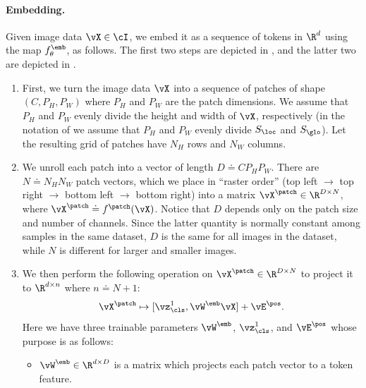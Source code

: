 \documentclass[../../book-main.tex]{subfiles}
\begin{document}
\paragraph{Embedding.} Given image data \(\vX \in \cI\), we embed it
as a sequence of tokens in \(\R^{d}\) using the map
\(f_{\theta}^{\emb}\), as follows. The first two steps are depicted
in , and the latter two are depicted in
.
\begin{enumerate}
    \item First, we turn the image data \(\vX\) into a sequence of
        patches of shape \((C, P_{H}, P_{W})\) where \(P_{H}\) and
        \(P_{W}\) are the patch dimensions. We assume that \(P_{H}\)
        and \(P_{W}\) evenly divide the height and width of \(\vX\),
        respectively (in the notation of
             we assume that
            \(P_{H}\) and \(P_{W}\) evenly divide \(S_{\loc}\) and
        \(S_{\glo}\)). Let the resulting grid of patches have
        \(N_{H}\) rows and \(N_{W}\) columns.
    \item We unroll each patch into a vector of length \(D \doteq
        CP_{H}P_{W}\). There are \(N \doteq N_{H}N_{W}\) patch
        vectors, which we place in ``raster order'' (top left \(\to\)
        top right \(\to\) bottom left \(\to\) bottom right) into a
        matrix \(\vX^{\patch} \in \R^{D \times N}\), where
        \(\vX^{\patch} \doteq f^{\patch}(\vX)\). Notice that \(D\)
        depends only on the patch size and number of channels. Since
        the latter quantity is normally constant among samples in the
        same dataset, \(D\) is the same for all images in the
        dataset, while \(N\) is different for larger and smaller images.
    \item We then perform the following operation on \(\vX^{\patch}
        \in \R^{D \times N}\) to project it to \(\R^{d \times n}\)
        where \(n \doteq N + 1\):
        \begin{equation}
            \vX^{\patch} \mapsto [\vz_{\cls}^{1}, \vW^{\emb}\vX] + \vE^{\pos}.
        \end{equation}
        Here we have three trainable parameters \(\vW^{\emb}\),
        \(\vz_{\cls}^{1}\), and \(\vE^{\pos}\) whose purpose is as follows:
        \begin{itemize}
            \item \(\vW^{\emb} \in \R^{d \times D}\) is a matrix
                which projects each patch vector to a token feature.

\end{itemize}
\end{enumerate}
\end{document}
